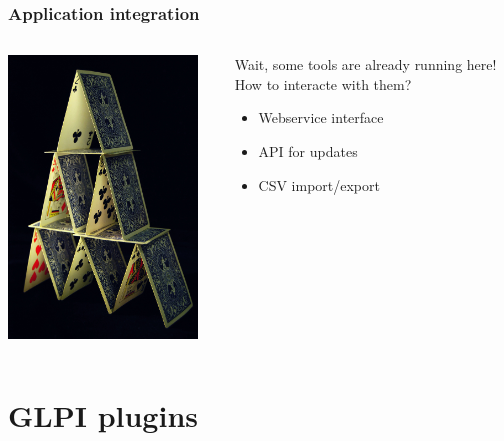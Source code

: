 \documentclass{beamer}
\begin{document}
\begin{frame}

    \frametitle{Application integration}
 \begin{columns}
 \begin{column}{0.45\textwidth}
         \includegraphics[height=7.5cm]{./pics/house_of_cards.jpg}
 \end{column}
 \begin{column}{0.45\textwidth}
     \begin{block}{Wait, some tools are already running here! \\
     How to interacte with them?}
        \begin{itemize}
            \item Webservice interface
            \item API for updates
            \item CSV import/export
        \end{itemize}
    \end{block}

 \end{column}
\end{columns}
\end{frame}



\section{GLPI plugins}
\end{document}
